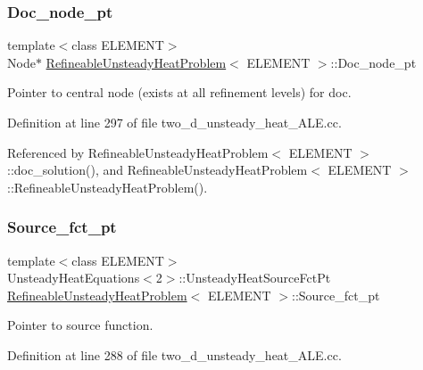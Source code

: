 \subsubsection{\texorpdfstring{Doc\+\_\+node\+\_\+pt}{Doc\_node\_pt}}
{\footnotesize\ttfamily template$<$class E\+L\+E\+M\+E\+NT$>$ \\
Node$\ast$ \hyperlink{classRefineableUnsteadyHeatProblem}{Refineable\+Unsteady\+Heat\+Problem}$<$ E\+L\+E\+M\+E\+NT $>$\+::Doc\+\_\+node\+\_\+pt\hspace{0.3cm}{\ttfamily [private]}}



Pointer to central node (exists at all refinement levels) for doc. 



Definition at line 297 of file two\+\_\+d\+\_\+unsteady\+\_\+heat\+\_\+\+A\+L\+E.\+cc.



Referenced by Refineable\+Unsteady\+Heat\+Problem$<$ E\+L\+E\+M\+E\+N\+T $>$\+::doc\+\_\+solution(), and Refineable\+Unsteady\+Heat\+Problem$<$ E\+L\+E\+M\+E\+N\+T $>$\+::\+Refineable\+Unsteady\+Heat\+Problem().

\mbox{\label{classRefineableUnsteadyHeatProblem_a99eb5a2cd4b680b4f83e739bd4e16639}} 
\subsubsection{\texorpdfstring{Source\+\_\+fct\+\_\+pt}{Source\_fct\_pt}}
{\footnotesize\ttfamily template$<$class E\+L\+E\+M\+E\+NT$>$ \\
Unsteady\+Heat\+Equations$<$2$>$\+::Unsteady\+Heat\+Source\+Fct\+Pt \hyperlink{classRefineableUnsteadyHeatProblem}{Refineable\+Unsteady\+Heat\+Problem}$<$ E\+L\+E\+M\+E\+NT $>$\+::Source\+\_\+fct\+\_\+pt\hspace{0.3cm}{\ttfamily [private]}}



Pointer to source function. 



Definition at line 288 of file two\+\_\+d\+\_\+unsteady\+\_\+heat\+\_\+\+A\+L\+E.\+cc.



